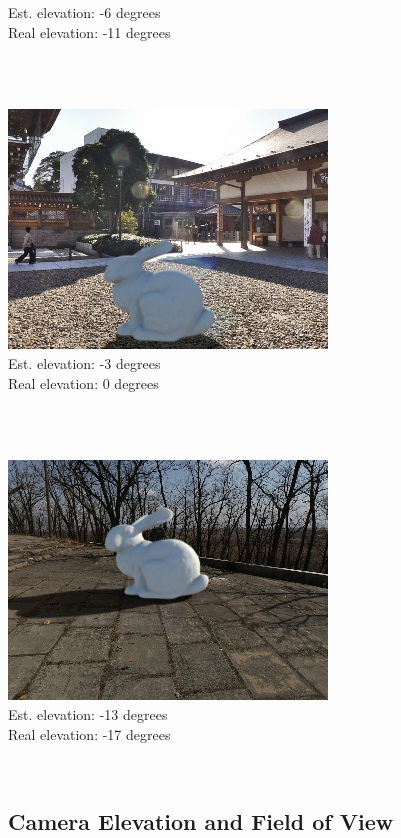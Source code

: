 \begin{multicols}{2}
\begin{minipage}{\linewidth}
Est. elevation: -6 degrees\\
Real elevation: -11 degrees\\
\end{minipage} \\
~\\
\begin{minipage}{\linewidth}
\includegraphics[width=\mywidth]{pano_aaqpmaoqocdqfu_002.jpg}\\
Est. elevation: -3 degrees\\
Real elevation: 0 degrees\\
\end{minipage} \\
~\\
\begin{minipage}{\linewidth}
\includegraphics[width=\mywidth]{pano_aczfirgbavyyri.jpg}\\
Est. elevation: -13 degrees\\
Real elevation: -17 degrees\\
\end{minipage} \\

\end{multicols}

\subsection{Camera Elevation and Field of View}

